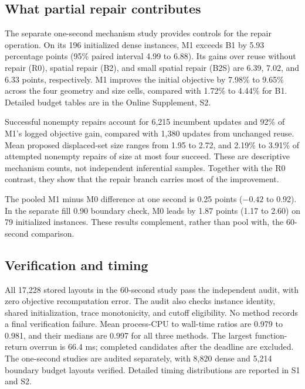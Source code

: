 \documentclass[preprint,12pt,authoryear,nonatbib]{elsarticle}
\begin{document}
\subsection{What partial repair contributes}
\label{sec:sharedresult}
The separate one-second mechanism study provides controls for the repair
operation. On its 196 initialized dense instances, M1 exceeds B1 by
5.93 percentage points (95\% paired interval 4.99 to 6.88). Its gains over
reuse without repair (R0), spatial repair (B2), and small spatial repair
(B2S) are 6.39, 7.02, and 6.33 points, respectively. M1 improves the
initial objective by 7.98\% to 9.65\% across the four geometry and size
cells, compared with 1.72\% to 4.44\% for B1. Detailed budget tables
are in the Online Supplement, S2.

Successful nonempty repairs account for 6,215 incumbent updates and 92\%
of M1's logged objective gain, compared with 1,380 updates from unchanged
reuse. Mean proposed displaced-set size ranges from 1.95 to 2.72, and
2.19\% to 3.91\% of attempted nonempty repairs of size at most four succeed.
These are descriptive mechanism counts, not independent inferential samples.
Together with the R0 contrast, they show that the repair branch carries
most of the improvement.

The pooled M1 minus M0 difference at one second is 0.25 points
($-0.42$ to 0.92). In the separate fill 0.90 boundary check, M0 leads
by 1.87 points (1.17 to 2.60) on 79 initialized instances. These results
complement, rather than pool with, the 60-second comparison.

\subsection{Verification and timing}
All 17,228 stored layouts in the 60-second study pass the independent audit,
with zero objective recomputation error. The audit also checks instance
identity, shared initialization, trace monotonicity, and cutoff eligibility.
No method records a final verification failure. Mean process-CPU to wall-time
ratios are 0.979 to 0.981, and their medians are 0.997 for all three methods.
The largest function-return overrun is 66.4 ms; completed candidates after the
deadline are excluded. The one-second studies are audited separately, with
8,820 dense and 5,214 boundary budget layouts verified. Detailed timing
distributions are reported in S1 and S2.
\end{document}
